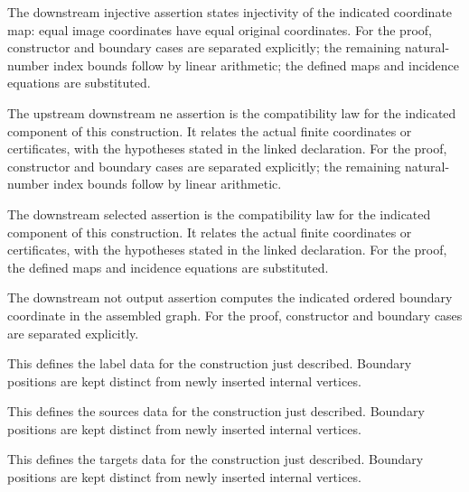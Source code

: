 The downstream injective assertion states injectivity of the indicated coordinate map: equal image coordinates have equal original coordinates.
For the proof, constructor and boundary cases are separated explicitly; the remaining natural-number index bounds follow by linear arithmetic; the defined maps and incidence equations are substituted.
\par{}

The upstream downstream ne assertion is the compatibility law for the indicated component of this construction. It relates the actual finite coordinates or certificates, with the hypotheses stated in the linked declaration.
For the proof, constructor and boundary cases are separated explicitly; the remaining natural-number index bounds follow by linear arithmetic.
\par{}

The downstream selected assertion is the compatibility law for the indicated component of this construction. It relates the actual finite coordinates or certificates, with the hypotheses stated in the linked declaration.
For the proof, the defined maps and incidence equations are substituted.
\par{}

The downstream not output assertion computes the indicated ordered boundary coordinate in the assembled graph.
For the proof, constructor and boundary cases are separated explicitly.
\par{}

This defines the label data for the construction just described. Boundary positions are kept distinct from newly inserted internal vertices.
\par{}

This defines the sources data for the construction just described. Boundary positions are kept distinct from newly inserted internal vertices.
\par{}

This defines the targets data for the construction just described. Boundary positions are kept distinct from newly inserted internal vertices.
\par{}

